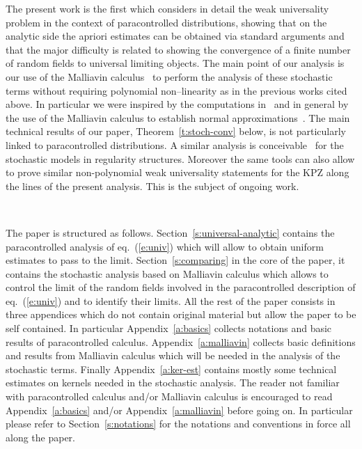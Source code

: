 \documentclass[a4paper,11pt]{article}
\begin{document}
The present work is the first which considers in detail the weak universality
problem in the context of paracontrolled distributions, showing that on the
analytic side the apriori estimates can be obtained via standard arguments and
that the major difficulty is related to showing the convergence of a finite
number of random fields to universal limiting objects. The main point of our
analysis is our use of the Malliavin
calculus~{\cite{nualart_2006,nourdin_peccati_2012}} to perform the analysis of
these stochastic terms without requiring polynomial non--linearity as in the
previous works cited above. In particular we were inspired by the computations
in~{\cite{nourdin_nualart_2007}} and in general by the use of the Malliavin
calculus to establish normal approximations~{\cite{nourdin_peccati_2012}}. The
main technical results of our paper, Theorem~\ref{t:stoch-conv} below, is not
particularly linked to paracontrolled distributions. A similar analysis is
conceivable \ for the stochastic models in regularity structures. Moreover the
same tools can also allow to prove similar non-polynomial weak universality
statements for the KPZ along the lines of the present analysis. This is the
subject of ongoing work.

\

The paper is structured as follows. Section~\ref{s:universal-analytic}
contains the paracontrolled analysis of eq.~(\ref{e:univ}) which will allow to
obtain uniform estimates to pass to the limit. Section~\ref{s:comparing} in
the core of the paper, it contains the stochastic analysis based on Malliavin
calculus which allows to control the limit of the random fields involved in
the paracontrolled description of eq.~(\ref{e:univ}) and to identify their
limits. All the rest of the paper consists in three appendices which do not
contain original material but allow the paper to be self contained. In
particular Appendix~\ref{a:basics} collects notations and basic results of
paracontrolled calculus. Appendix~\ref{a:malliavin} collects basic definitions
and results from Malliavin calculus which will be needed in the analysis of
the stochastic terms. Finally Appendix~\ref{a:ker-est} contains mostly some
technical estimates on kernels needed in the stochastic analysis. The reader
not familiar with paracontrolled calculus and/or Malliavin calculus is
encouraged to read Appendix~\ref{a:basics} and/or Appendix~\ref{a:malliavin}
before going on. In particular please refer to Section~\ref{s:notations} for
the notations and conventions in force all along the paper.
\end{document}

